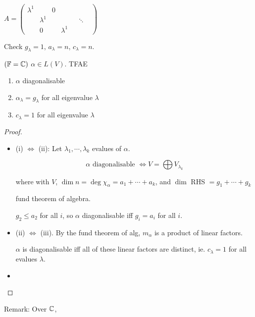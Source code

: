 \documentclass[a4paper]{article}
\begin{document}
\begin{eg}
	$ A = \begin{pmatrix}
	\lambda^{1} & & 0 \\
	& \lambda^{1} & &
	& & \ddots & \\
	& 0 & & \lambda^{1} 
	\end{pmatrix} $
	
	
	Check $ g_{\lambda} = 1 $, $ a_{\lambda} = n $, $ c_{\lambda} = n $.
	
\end{eg}

\begin{lemma} $ (\mathbb{F} = \mathbb{C}) $
	$ \alpha \in L(V) $. TFAE
	\begin{enumerate}
		\item $ \alpha $ diagonalisable
		\item $ \alpha_{\lambda} = g_{\lambda} $ for all eigenvalue $ \lambda $
		\item $ c_{\lambda} = 1 $ for all eigenvalue $ \lambda $
		
	\end{enumerate}
\end{lemma}

\begin{proof}
	\begin{itemize}
		\item (i) $ \iff $ (ii): Let $ \lambda_{1}, \cdots, \lambda_{k} $ evalues of $ \alpha $. 
		
		\[ \alpha \text{ diagonalisable } \iff V = \bigoplus V_{\lambda_{k}} \]
		
		where with $ V $, $ \dim n  = \deg \chi_{\alpha} = a_{1} + \cdots + a_{k}$, and $ \dim  $ RHS $ = g_{1} + \cdots + g_{k} $
		
		fund theorem of algebra.
		
		$ g_{2} \leq a_{2} $ for all $ i $, so $ \alpha $ diagonalisable iff $ g_{i} = a_{i} $ for all $ i $.
		
		\item (ii) $ \iff $ (iii). By the fund theorem of alg, $ m_{\alpha} $ is a product of linear factors. 
		
		$ \alpha $ is diagonalisable iff all of these linear factors are distinct, ie. $ c_{\lambda} = 1 $ for all evalues $ \lambda $.  
		
		\item 
	\end{itemize}
\end{proof}

Remark: Over $ \mathbb{C} $,
\end{document}
